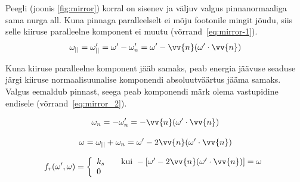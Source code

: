 \documentclass[a4paper,12pt]{report}
\renewcommand{\vec}[1]{\vv{#1}}
\begin{document}
Peegli (joonis \ref{fig:mirror}) korral on sisenev ja väljuv valgus pinnanormaaliga sama nurga all.
Kuna pinnaga paralleelselt ei mõju footonile mingit jõudu, siis selle
kiiruse paralleelne komponent ei muutu (võrrand~\ref{eq:mirror-1}).
\begin{equation} \label{eq:mirror-1}
\omega_{||} = \omega'_{||} = \omega' - \omega'_{n} = \omega' -\vec n(\omega'\cdot\vec n)
\end{equation}

Kuna kiiruse paralleelne komponent jääb samaks, peab energia jäävuse
seaduse järgi kiiruse normaalisuunalise komponendi absoluutväärtus jääma
samaks. Valgus eemaldub pinnast, seega peab komponendi märk olema vastupidine
endisele (võrrand~\ref{eq:mirror_2}).

\begin{equation} \label{eq:mirror_2}
\omega_n = -\omega'_n = -\vec n(\omega'\cdot\vec n)
\end{equation}

\begin{minipage}{0.5\textwidth}
\[\omega = \omega_{||} + \omega_n = \omega' - 2\vec n(\omega'\cdot\vec n)\]
\end{minipage}

\[f_r(\omega', \omega) = \left\{\begin{array}{l l} k_s & \quad \text{kui} ~ -[\omega'-2\vec n(\omega'\cdot\vec n)] = \omega \\ 0 \end{array} \right. \]
\end{document}
